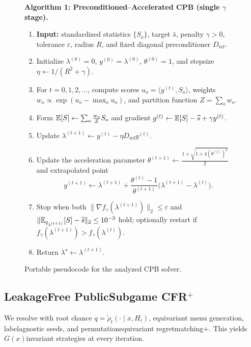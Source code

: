 \begin{figure}[t]
\centering
\begin{minipage}{0.96\linewidth}
\small
\textbf{Algorithm 1: Preconditioned--Accelerated CPB (single $\gamma$ stage).}
\begin{enumerate}
\item \textbf{Input:} standardized statistics $\{S_o\}$, target $\widehat s$, penalty $\gamma>0$, tolerance $\varepsilon$, radius $R$, and fixed diagonal preconditioner $D_{\mathrm{ref}}$.
\item Initialize $\lambda^{(0)}=0$, $y^{(0)}=\lambda^{(0)}$, $\theta^{(0)}=1$, and stepsize $\eta\gets 1/(R^2+\gamma)$.
\item For $t=0,1,2,\ldots$, compute scores $u_o=\langle y^{(t)},S_o\rangle$, weights $w_o \propto \exp(u_o-\max_o u_o)$, and partition function $Z=\sum_o w_o$.
\item Form $\mathbb{E}[S]\gets \sum_o \frac{w_o}{Z}S_o$ and gradient $g^{(t)}\gets \mathbb{E}[S]-\widehat s + \gamma y^{(t)}$.
\item Update $\lambda^{(t+1)}\gets y^{(t)}-\eta D_{\mathrm{ref}}g^{(t)}$.
\item Update the acceleration parameter $\theta^{(t+1)}\gets \tfrac{1+\sqrt{1+4(\theta^{(t)})^2}}{2}$ and extrapolated point
\[
y^{(t+1)}\gets \lambda^{(t+1)}+\frac{\theta^{(t)}-1}{\theta^{(t+1)}}\bigl(\lambda^{(t+1)}-\lambda^{(t)}\bigr).
\]
\item Stop when both $\|\nabla f_\gamma(\lambda^{(t+1)})\|_2 \le \varepsilon$ and $\|\mathbb{E}_{q_{\lambda^{(t+1)}}}[S]-\widehat s\|_2\le 10^{-3}$ hold; optionally restart if $f_\gamma(\lambda^{(t+1)})>f_\gamma(\lambda^{(t)})$.
\item Return $\lambda^\star\gets \lambda^{(t+1)}$.
\end{enumerate}
\end{minipage}
\caption{Portable pseudocode for the analyzed CPB solver.}
\label{alg:cpb}
\end{figure}

\subsection{\texorpdfstring{Leakage\textendash Free Public\textendash Subgame CFR$^+$}{Leakage-Free Public-Subgame CFR+}}
We re\textendash solve with root chance $q=\tilde\rho_t(\cdot\mid x,H_i)$, equivariant menu generation, label\textendash agnostic seeds, and permutation\textendash equivariant regret\textendash matching$+$. This yields $G(x)$\textendash invariant strategies at every iteration.

